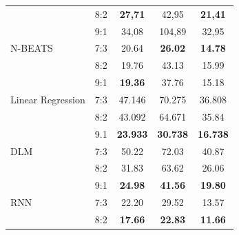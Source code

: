 \documentclass[conference]{IEEEtran}
\begin{document}
\begin{table}[ht]
\begin{tabular}{|l|l|c|c|c|}
                               & 8:2                         & \textbf{27,71}            & 42,95                          & \textbf{21,41}           \\ \cline{2-5}
                               & 9:1                         & 34,08                     & 104,89                         & 32,95                    \\ \hline
        N-BEATS                & 7:3                         & 20.64                     & \textbf{26.02}                 & \textbf{14.78}           \\ \cline{2-5}
                               & 8:2                         & 19.76                     & 43.13                          & 15.99                    \\ \cline{2-5}
                               & 9:1                         & \textbf{19.36}            & 37.76                          & 15.18                    \\ \hline
        Linear Regression      & 7:3                         & 47.146                    & 70.275                         & 36.808                   \\ \cline{2-5}
                               & 8:2                         & 43.092                    & 64.671                         & 35.84                    \\ \cline{2-5}
                               & 9.1                         & \textbf{23.933}           & \textbf{30.738}                & \textbf{16.738}          \\ \hline
        DLM                    & 7:3                         & 50.22                     & 72.03                          & 40.87                    \\ \cline{2-5}
                               & 8:2                         & 31.83                     & 63.62                          & 26.06                    \\ \cline{2-5}
                               & 9:1                         & \textbf{24.98}            & \textbf{41.56}                 & \textbf{19.80}           \\ \hline
        RNN                    & 7:3                         & 22.20                     & 29.52                          & 13.57                    \\ \cline{2-5}
                               & 8:2                         & \textbf{17.66}            & \textbf{22.83}                 & \textbf{11.66}           \\ \cline{2-5}

\end{tabular}
\end{table}
\end{document}
